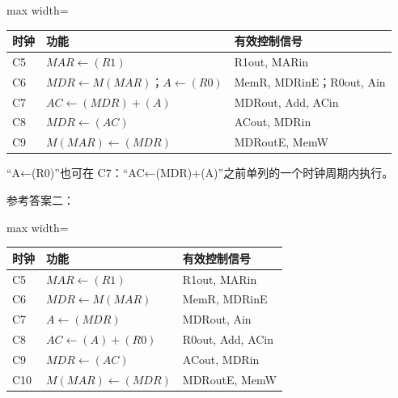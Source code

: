 \documentclass[UTF8,11pt]{ctexart}
\begin{document}
\begin{center}\begin{adjustbox}{max width=\linewidth}\begin{tabular}{|>{\raggedright\arraybackslash}p{\dimexpr(\linewidth-6\tabcolsep-4\arrayrulewidth)/3\relax}|>{\raggedright\arraybackslash}p{\dimexpr(\linewidth-6\tabcolsep-4\arrayrulewidth)/3\relax}|>{\raggedright\arraybackslash}p{\dimexpr(\linewidth-6\tabcolsep-4\arrayrulewidth)/3\relax}|}\hline
时钟 & 功能 & 有效控制信号\\\hline
C5 & \(\displaystyle MAR\leftarrow (R1)\) & R1out, MARin\\\hline
C6 & \(\displaystyle MDR\leftarrow M(MAR)\)；\(\displaystyle A\leftarrow (R0)\) & MemR, MDRinE；R0out, Ain\\\hline
C7 & \(\displaystyle AC\leftarrow (MDR)+(A)\) & MDRout, Add, ACin\\\hline
C8 & \(\displaystyle MDR\leftarrow (AC)\) & ACout, MDRin\\\hline
C9 & \(\displaystyle M(MAR)\leftarrow (MDR)\) & MDRoutE, MemW\\\hline\end{tabular}\end{adjustbox}\end{center}

“A←(R0)”也可在 C7：“AC←(MDR)+(A)”之前单列的一个时钟周期内执行。


参考答案二：


\begin{center}\begin{adjustbox}{max width=\linewidth}\begin{tabular}{|>{\raggedright\arraybackslash}p{\dimexpr(\linewidth-6\tabcolsep-4\arrayrulewidth)/3\relax}|>{\raggedright\arraybackslash}p{\dimexpr(\linewidth-6\tabcolsep-4\arrayrulewidth)/3\relax}|>{\raggedright\arraybackslash}p{\dimexpr(\linewidth-6\tabcolsep-4\arrayrulewidth)/3\relax}|}\hline
时钟 & 功能 & 有效控制信号\\\hline
C5 & \(\displaystyle MAR\leftarrow (R1)\) & R1out, MARin\\\hline
C6 & \(\displaystyle MDR\leftarrow M(MAR)\) & MemR, MDRinE\\\hline
C7 & \(\displaystyle A\leftarrow (MDR)\) & MDRout, Ain\\\hline
C8 & \(\displaystyle AC\leftarrow (A)+(R0)\) & R0out, Add, ACin\\\hline
C9 & \(\displaystyle MDR\leftarrow (AC)\) & ACout, MDRin\\\hline
C10 & \(\displaystyle M(MAR)\leftarrow (MDR)\) & MDRoutE, MemW\\\hline\end{tabular}\end{adjustbox}\end{center}
\end{document}
